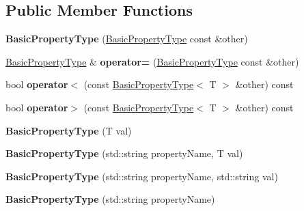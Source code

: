\subsection*{Public Member Functions}
\begin{DoxyCompactItemize}
\item 
\hypertarget{classBasicPropertyType_a9d967556ec7106be014ef360e8ad729c}{{\bfseries Basic\-Property\-Type} (\hyperlink{classBasicPropertyType}{Basic\-Property\-Type} const \&other)}\label{classBasicPropertyType_a9d967556ec7106be014ef360e8ad729c}

\item 
\hypertarget{classBasicPropertyType_adf19305750a4f3aaf605ae2b18353e32}{\hyperlink{classBasicPropertyType}{Basic\-Property\-Type} \& {\bfseries operator=} (\hyperlink{classBasicPropertyType}{Basic\-Property\-Type} const \&other)}\label{classBasicPropertyType_adf19305750a4f3aaf605ae2b18353e32}

\item 
\hypertarget{classBasicPropertyType_ae2a1d3c9885b05c9d022d1a01e28888e}{bool {\bfseries operator$<$} (const \hyperlink{classBasicPropertyType}{Basic\-Property\-Type}$<$ T $>$ \&other) const }\label{classBasicPropertyType_ae2a1d3c9885b05c9d022d1a01e28888e}

\item 
\hypertarget{classBasicPropertyType_a6cb6f98a17ae2ae19c94643de930a73c}{bool {\bfseries operator$>$} (const \hyperlink{classBasicPropertyType}{Basic\-Property\-Type}$<$ T $>$ \&other) const }\label{classBasicPropertyType_a6cb6f98a17ae2ae19c94643de930a73c}

\item 
\hypertarget{classBasicPropertyType_a0fcc2038187aad4b1ee6223daaff65d6}{{\bfseries Basic\-Property\-Type} (T val)}\label{classBasicPropertyType_a0fcc2038187aad4b1ee6223daaff65d6}

\item 
\hypertarget{classBasicPropertyType_a5336941eaf15eefbfc9f84554619b72d}{{\bfseries Basic\-Property\-Type} (std\-::string property\-Name, T val)}\label{classBasicPropertyType_a5336941eaf15eefbfc9f84554619b72d}

\item 
\hypertarget{classBasicPropertyType_a1bb538ecec45a113bbfc1fa23eabfde1}{{\bfseries Basic\-Property\-Type} (std\-::string property\-Name, std\-::string val)}\label{classBasicPropertyType_a1bb538ecec45a113bbfc1fa23eabfde1}

\item 
\hypertarget{classBasicPropertyType_a4f8b38f1e145d5ee7387a58faaef8e60}{{\bfseries Basic\-Property\-Type} (std\-::string property\-Name)}\label{classBasicPropertyType_a4f8b38f1e145d5ee7387a58faaef8e60}


\end{DoxyCompactItemize}
